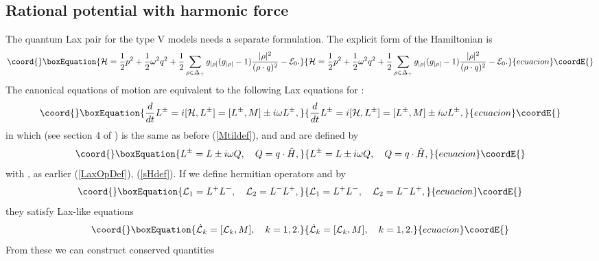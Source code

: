 \documentclass[a4paper,12pt]{article}
\begin{document}
\subsection{Rational potential with harmonic force}
\label{harmL}
The quantum Lax pair for the  type V models needs a separate formulation.
The
explicit form of the Hamiltonian is
\begin{equation}\coord{}\boxEquation{
   {\cal H}={1\over2}p^2+{1\over2}\omega^2q^2+
   {1\over2}\sum_{\rho\in\Delta_+}
      {g_{|\rho|}(g_{|\rho|}-1)}{|\rho|^{2}\over{(\rho\cdot q)^2}}
    -{\cal E}_0.
   \label{1stratharm}
}{
   {\cal H}={1\over2}p^2+{1\over2}\omega^2q^2+
   {1\over2}\sum_{\rho\in\Delta_+}
      {g_{|\rho|}(g_{|\rho|}-1)}{|\rho|^{2}\over{(\rho\cdot q)^2}}
    -{\cal E}_0.
   }{ecuacion}\coordE{}\end{equation}
The canonical equations of motion are equivalent to the following
Lax equations for \coordHE{}:
\begin{equation}\coord{}\boxEquation{
   {d\over dt}{L^\pm}=i[{\cal H},L^\pm]=
   [L^{\pm},{M}]\pm i\omega L^{\pm},
   \label{omegaLM}
}{
   {d\over dt}{L^\pm}=i[{\cal H},L^\pm]=
   [L^{\pm},{M}]\pm i\omega L^{\pm},
   }{ecuacion}\coordE{}\end{equation}
in which (see section 4 of \cite{bcs2})
\coordHE{} is the same as before (\ref{Mtildef}), and
 \coordHE{} and \coordHE{} are defined by
\begin{equation}\coord{}\boxEquation{
   L^{\pm}=L\pm i\omega Q, \quad Q=q\cdot\hat{H},
\label{Lpmdef}
}{
   L^{\pm}=L\pm i\omega Q, \quad Q=q\cdot\hat{H},
}{ecuacion}\coordE{}\end{equation}
with \coordHE{}, \coordHE{} as earlier (\ref{LaxOpDef}), (\ref{sHdef}).
If we define hermitian operators \coordHE{} and \coordHE{} by
\begin{equation}\coord{}\boxEquation{
   {\cal L}_1=L^+L^-,\quad {\cal L}_2=L^-L^+,
   \label{defcalL}
}{
   {\cal L}_1=L^+L^-,\quad {\cal L}_2=L^-L^+,
   }{ecuacion}\coordE{}\end{equation}
they satisfy Lax-like equations
   \begin{equation}\coord{}\boxEquation{
   \dot{{\cal L}}_k=[{\cal L}_k,{M}],\quad k=1,2.
}{
   \dot{{\cal L}}_k=[{\cal L}_k,{M}],\quad k=1,2.
}{ecuacion}\coordE{}\end{equation}
\noindent From these we can construct conserved quantities
\end{document}

